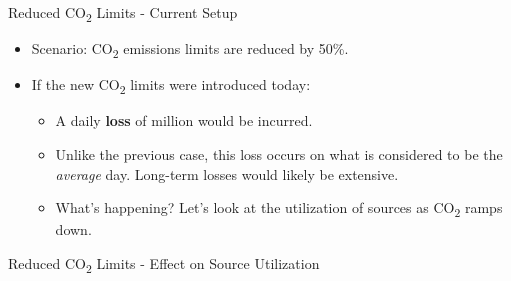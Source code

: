 \documentclass{beamer}
\begin{document}
    \begin{frame}{Reduced CO\textsubscript{2} Limits - Current Setup}
    
        \begin{itemize}
    
    		\item Scenario: CO\textsubscript{2} emissions limits are reduced by 50\%.
                
                \pause
    	
        	\item If the new CO\textsubscript{2} limits were introduced today:
    
            \begin{itemize}

                \item A daily \textbf{loss} of  million would be incurred.

                \item Unlike the previous case, this loss occurs on what is considered to be the \textit{average} day.  Long-term losses would likely be extensive.

                \item What's happening?  Let's look at the utilization of sources as CO\textsubscript{2} ramps down.

            \end{itemize}
         
         \end{itemize}
        
    \end{frame}
    
    
    \begin{frame}{Reduced CO\textsubscript{2} Limits - Effect on Source Utilization}
    	
         
        
        \missingfigure
        
        
        
    \end{frame}
    
\end{document}
